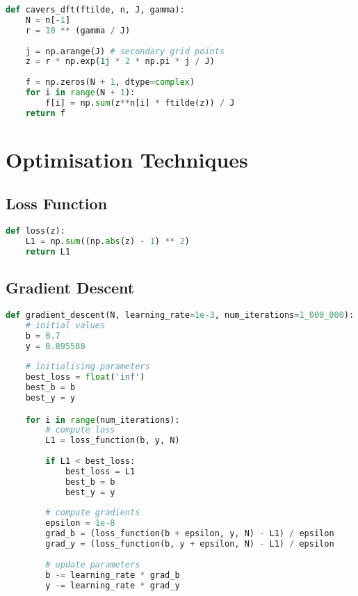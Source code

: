 \begin{appendices}
\begin{lstlisting}[language=Python, caption= Implementation of \citet{Cavers1978FFT}'s DFT NIZT (Equation \ref{equation:cavers_sum})]
def cavers_dft(ftilde, n, J, gamma):
    N = n[-1]
    r = 10 ** (gamma / J)
    
    j = np.arange(J) # secondary grid points
    z = r * np.exp(1j * 2 * np.pi * j / J)
    
    f = np.zeros(N + 1, dtype=complex)
    for i in range(N + 1):
        f[i] = np.sum(z**n[i] * ftilde(z)) / J
    return f
\end{lstlisting}

\newpage
\section{Optimisation Techniques}

\subsection{Loss Function}
\begin{lstlisting}[language=Python, caption= null]
def loss(z):
    L1 = np.sum((np.abs(z) - 1) ** 2)
    return L1
\end{lstlisting}

\subsection{Gradient Descent}
\begin{lstlisting}[language=Python, caption= null]
def gradient_descent(N, learning_rate=1e-3, num_iterations=1_000_000):
	# initial values
    b = 0.7
    y = 0.895588
    
    # initialising parameters
    best_loss = float('inf')
    best_b = b
    best_y = y

    for i in range(num_iterations):
        # compute loss
        L1 = loss_function(b, y, N)
        
        if L1 < best_loss:
            best_loss = L1
            best_b = b
            best_y = y
        
        # compute gradients 
        epsilon = 1e-8
        grad_b = (loss_function(b + epsilon, y, N) - L1) / epsilon
        grad_y = (loss_function(b, y + epsilon, N) - L1) / epsilon
        
        # update parameters
        b -= learning_rate * grad_b
        y -= learning_rate * grad_y
    

\end{lstlisting}
\end{appendices}
